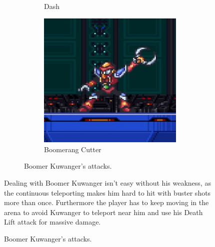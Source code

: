 \begin{figure}[htp]
\begin{figure}[htp]
\begin{subfigure}{0.41\linewidth}
		\caption{Dash}
	\end{subfigure}
	\begin{subfigure}{0.3\linewidth}
		\centering
		\includegraphics[width=\linewidth]{figures/X1/Boomer_kuwanger/Boomer_throw.jpg}
		\caption{Boomerang Cutter}
	\end{subfigure}
	\caption{Boomer Kuwanger's attacks.}
\end{figure}
Dealing with Boomer Kuwanger isn't easy without his weakness, as the continuous teleporting makes him hard to hit with buster shots more than once. Furthermore the player has to keep moving in the arena to avoid Kuwanger to teleport near him and use his Death Lift attack for massive damage.


\end{figure}
